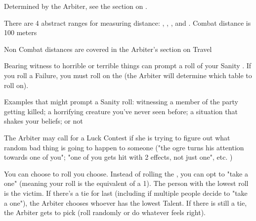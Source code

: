{
Determined by the Arbiter, see the section on .

\cbreak


There are 4 abstract ranges for measuring distance:  , , , and  .  \MAX Combat distance is 100 meters




Non Combat distances are covered in the Arbiter's section on Travel





Bearing witness to horrible or terrible things can prompt a roll of your Sanity \UD.  If you roll a Failure, you must roll on the  (the Arbiter will determine which table to roll on). 

Examples that might prompt a Sanity roll:  witnessing a member of the party getting killed; a horrifying creature you've never seen before; a situation that shakes your beliefs; or not 



The Arbiter may call for a Luck Contest if she is trying to figure out what random bad thing is going to happen to someone ("the ogre turns his attention towards one of you"; "one of you gets hit with 2 effects, not just one", etc. )

You can choose to roll   \UD you choose.  Instead of rolling the \UD, you can opt to "take a one" (meaning your roll is the equivalent of a 1).  The person with the lowest roll is the victim. If there's a tie for last (including if multiple people decide to "take a one"), the Arbiter chooses whoever has the lowest Talent.  If there is still a tie, the Arbiter gets to pick (roll randomly or do whatever feels right).

}
